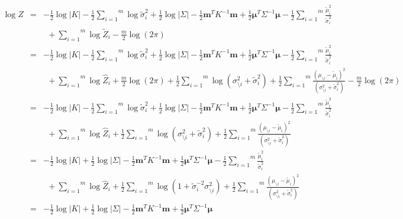 \documentclass[twoside,11pt]{article}
\def\m{{\mathbf m}}
\def\boldmu{\bm{\mu}}
\newcommand{\wo}{\setminus}
\begin{document}
\begin{eqnarray}
\log Z &= & 
-\frac{1}{2}\log\lvert K \rvert 
-\frac{1}{2}\overset{m}{\sum_{i=1}} \log \tilde{\sigma}^2_i
+ \frac{1}{2}\log\lvert \Sigma \rvert 
-\frac{1}{2}\m^TK^{-1}\m \nonumber 
+\frac{1}{2}\boldmu^T\Sigma^{-1}\boldmu
- \frac{1}{2}\overset{m}{\sum_{i=1}}\frac{\tilde{\mu}_i^2}{\tilde{\sigma}_i^2}  
\nonumber \\ && ~~
+ \overset{m}{\sum_{i=1}}\log
\tilde{Z}_i - \frac{m}{2}\log(2\pi) \nonumber \\
& = & 
-\frac{1}{2}\log\lvert K \rvert 
-\frac{1}{2}\overset{m}{\sum_{i=1}} \log \tilde{\sigma}^2_i
+ \frac{1}{2}\log\lvert \Sigma \rvert 
-\frac{1}{2}\m^TK^{-1}\m \nonumber 
+\frac{1}{2}\boldmu^T\Sigma^{-1}\boldmu
- \frac{1}{2}\overset{m}{\sum_{i=1}}\frac{\tilde{\mu}_i^2}{\tilde{\sigma}_i^2}\nonumber
\\ && ~~
+ \overset{m}{\sum_{i=1}}\log
\hat{Z}_i + \frac{m}{2}\log(2\pi) + \frac{1}{2}\overset{m}{\sum_{i=1}}\log (\sigma_{\wo i}^2 + \tilde{\sigma}^2_i) 
+ \frac{1}{2}\overset{m}{\sum_{i=1}}\frac{(\mu_{\wo i} - \tilde{\mu}_i)^2}{(\sigma_{\wo i}^2 + \tilde{\sigma}^2_i)}- \frac{m}{2}\log(2\pi) \nonumber \\
& = & 
-\frac{1}{2}\log\lvert K \rvert 
-\frac{1}{2}\overset{m}{\sum_{i=1}} \log \tilde{\sigma}^2_i
+ \frac{1}{2}\log\lvert \Sigma \rvert 
-\frac{1}{2}\m^TK^{-1}\m \nonumber 
+\frac{1}{2}\boldmu^T\Sigma^{-1}\boldmu
- \frac{1}{2}\overset{m}{\sum_{i=1}}\frac{\tilde{\mu}_i^2}{\tilde{\sigma}_i^2}\nonumber
\\ && ~~
+ \overset{m}{\sum_{i=1}}\log
\hat{Z}_i + \frac{1}{2}\overset{m}{\sum_{i=1}}\log (\sigma_{\wo i}^2 + \tilde{\sigma}^2_i) 
+ \frac{1}{2}\overset{m}{\sum_{i=1}}\frac{(\mu_{\wo i} - \tilde{\mu}_i)^2}{(\sigma_{\wo i}^2 + \tilde{\sigma}^2_i)} \nonumber \\
& = & 
-\frac{1}{2}\log\lvert K \rvert 
+ \frac{1}{2}\log\lvert \Sigma \rvert 
-\frac{1}{2}\m^TK^{-1}\m \nonumber 
+\frac{1}{2}\boldmu^T\Sigma^{-1}\boldmu
- \frac{1}{2}\overset{m}{\sum_{i=1}}\frac{\tilde{\mu}_i^2}{\tilde{\sigma}_i^2}
\nonumber \\ && ~~
+ \overset{m}{\sum_{i=1}}\log
\hat{Z}_i + \frac{1}{2}\overset{m}{\sum_{i=1}}\log (1 + \tilde{\sigma}^{-2}_i\sigma_{\wo i}^2) 
+ \frac{1}{2}\overset{m}{\sum_{i=1}}\frac{(\mu_{\wo i} - \tilde{\mu}_i)^2}{(\sigma_{\wo i}^2 + \tilde{\sigma}^2_i)} \nonumber \\
& = & 
-\frac{1}{2}\log\lvert K \rvert 
+ \frac{1}{2}\log\lvert \Sigma \rvert 
-\frac{1}{2}\m^TK^{-1}\m 
+\frac{1}{2}\boldmu^T\Sigma^{-1}\boldmu

\end{eqnarray}
\end{document}
